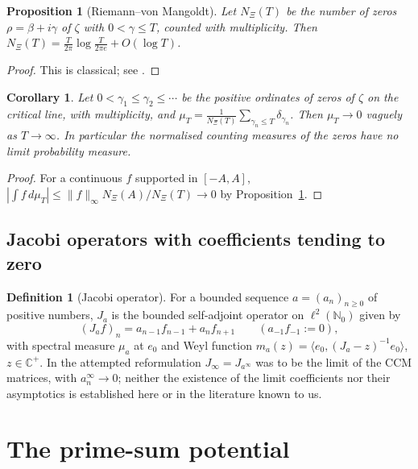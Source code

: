 \documentclass[11pt]{amsart}
\newtheorem{proposition}[theorem]{Proposition}
\newtheorem{corollary}[theorem]{Corollary}
\theoremstyle{definition}
\newtheorem{definition}[theorem]{Definition}
\theoremstyle{remark}
\newcommand{\Jinf}{J_\infty}
\newcommand{\gamn}{\gamma_n}
\begin{document}
\begin{proposition}[Riemann--von Mangoldt]\label{prop:count}
Let $N_\Xi(T)$ be the number of zeros $\rho=\beta+i\gamma$ of $\zeta$ with $0<\gamma\le T$,
counted with multiplicity. Then $N_\Xi(T)=\frac{T}{2\pi}\log\frac{T}{2\pi e}+O(\log T)$.
\end{proposition}
\begin{proof}
This is classical; see \cite[Ch.~15]{Davenport}.
\end{proof}

\begin{corollary}\label{cor:weak}
Let $0<\gamma_1\le\gamma_2\le\cdots$ be the positive ordinates of zeros of $\zeta$ on the
critical line, with multiplicity, and $\mu_T=\frac1{N_\Xi(T)}\sum_{\gamn\le T}\delta_{\gamn}$.
Then $\mu_T\to0$ vaguely as $T\to\infty$. In particular the normalised counting measures of the
zeros have no limit probability measure.
\end{corollary}
\begin{proof}
For a continuous $f$ supported in $[-A,A]$, $|\int f\,d\mu_T|\le\|f\|_\infty N_\Xi(A)/N_\Xi(T)
\to0$ by Proposition~\ref{prop:count}.
\end{proof}

\subsection{Jacobi operators with coefficients tending to zero}

\begin{definition}[Jacobi operator]\label{def:jinf}
For a bounded sequence $a=(a_n)_{n\ge0}$ of positive numbers, $J_a$ is the bounded self-adjoint
operator on $\ell^2(\mathbb N_0)$ given by
\[
(J_a f)_n=a_{n-1}f_{n-1}+a_nf_{n+1}\qquad(a_{-1}f_{-1}:=0),
\]
with spectral measure $\mu_a$ at $e_0$ and Weyl function
$m_a(z)=\langle e_0,(J_a-z)^{-1}e_0\rangle$, $z\in\mathbb C^+$. In the attempted reformulation
$\Jinf=J_{a^\infty}$ was to be the limit of the CCM matrices, with $a_n^\infty\to0$; neither the
existence of the limit coefficients nor their asymptotics is established here or in the
literature known to us.
\end{definition}

\section{The prime-sum potential}\label{sec:potential}
\end{document}
